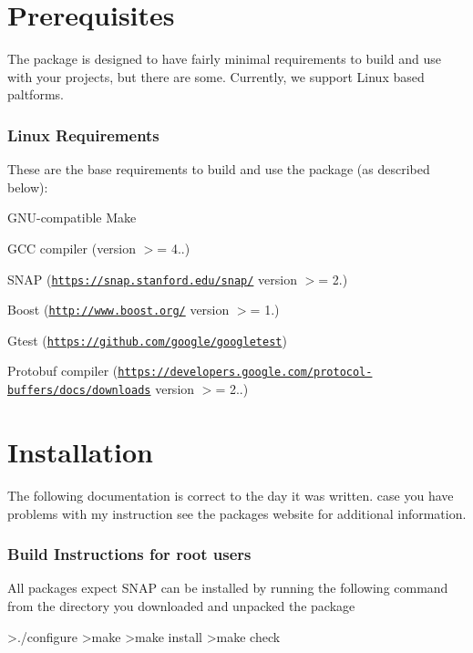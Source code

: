 \hypertarget{Install_Prerequisites}{}\section{Prerequisites}\label{Install_Prerequisites}
The package is designed to have fairly minimal requirements to build and use with your projects, but there are some. Currently, we support Linux based paltforms.

\subsubsection*{Linux Requirements}

These are the base requirements to build and use the package (as described below)\+:
\begin{DoxyEnumerate}
\item G\+N\+U-\/compatible Make
\item G\+C\+C compiler (version $>$= 4..)
\item S\+N\+A\+P (\href{https://snap.stanford.edu/snap/}{\tt https\+://snap.\+stanford.\+edu/snap/} version $>$= 2.)
\item Boost (\href{http://www.boost.org/}{\tt http\+://www.\+boost.\+org/} version $>$= 1.)
\item Gtest (\href{https://github.com/google/googletest}{\tt https\+://github.\+com/google/googletest})
\item Protobuf compiler (\href{https://developers.google.com/protocol-buffers/docs/downloads}{\tt https\+://developers.\+google.\+com/protocol-\/buffers/docs/downloads} version $>$= 2..)
\end{DoxyEnumerate}\hypertarget{Install_install_sec}{}\section{Installation}\label{Install_install_sec}
The following documentation is correct to the day it was written. case you have problems with my instruction see the packages website for additional information.

\subsubsection*{Build Instructions for root users}

All packages expect S\+N\+A\+P can be installed by running the following command from the directory you downloaded and unpacked the package \begin{DoxyVerb}>./configure
>make
>make install
>make check
\end{DoxyVerb}


